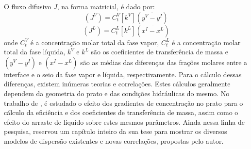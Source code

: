 O fluxo difusivo $J$, na forma matricial, é dado por:
\begin{equation}
\left( J^V\right)  = C_t^V \left[ k^V\right] \left( \overline{y^V-y^I}\right) 
\label{eq:diffusionvap}
\end{equation}
\begin{equation}
\left( J^L\right)  = C_t^L \left[ k^L\right] \left( \overline{x^I-x^L}\right) 
\label{eq:diffusionliq}
\end{equation}
onde $C_t^V$ é a concentração molar total da fase vapor, $C_t^L$ é a
concentração molar total da fase líquida, $k^V$ e $k^L$ são os coeficientes de transferência de massa e
$\left( \overline{y^V-y^I}\right)$ e $\left( \overline{x^I-x^L}\right)$ são as médias das diferenças das frações
molares entre a interface e o seio da fase vapor e líquida, respectivamente.
Para o cálculo dessas diferenças, existem inúmeras teorias e correlações. Estes
cálculos geralmente dependem da geometria do prato e das condições hidráulicas do mesmo. No trabalho de
, é estudado o efeito dos gradientes de concentração no prato para o cálculo da eficiência e dos
coeficientes de transferência de massa, assim como o efeito do arraste de líquido sobre estes mesmos parâmetros. Ainda
nessa linha de pesquisa,  reservou um capítulo inteiro da sua tese para mostrar os
diversos modelos de dispersão existentes e novas correlações, propostas pelo autor.


